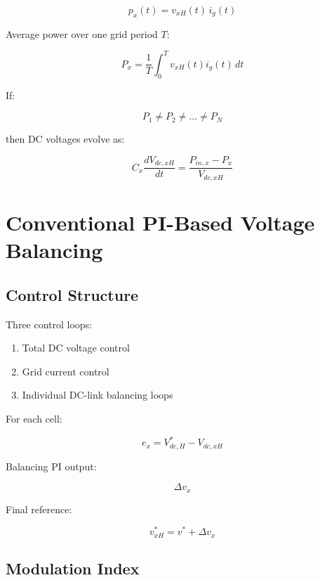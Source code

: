 \documentclass[11pt]{article}
\begin{document}
\begin{equation}
p_x(t) = v_{xH}(t)\, i_g(t)
\end{equation}

Average power over one grid period $T$:

\begin{equation}
P_x = \frac{1}{T} \int_0^T v_{xH}(t) i_g(t)\, dt
\end{equation}

If:

\[
P_1 \neq P_2 \neq \dots \neq P_N
\]

then DC voltages evolve as:

\begin{equation}
C_x \frac{dV_{dc,xH}}{dt}
=
\frac{P_{in,x} - P_x}{V_{dc,xH}}
\end{equation}

\section{Conventional PI-Based Voltage Balancing}

\subsection{Control Structure}

Three control loops:

\begin{enumerate}
\item Total DC voltage control
\item Grid current control
\item Individual DC-link balancing loops
\end{enumerate}

For each cell:

\begin{equation}
e_x = V_{dc,H}^* - V_{dc,xH}
\end{equation}

Balancing PI output:

\begin{equation}
\Delta v_x
\end{equation}

Final reference:

\begin{equation}
v_{xH}^* = v^* + \Delta v_x
\end{equation}

\subsection{Modulation Index}
\end{document}
